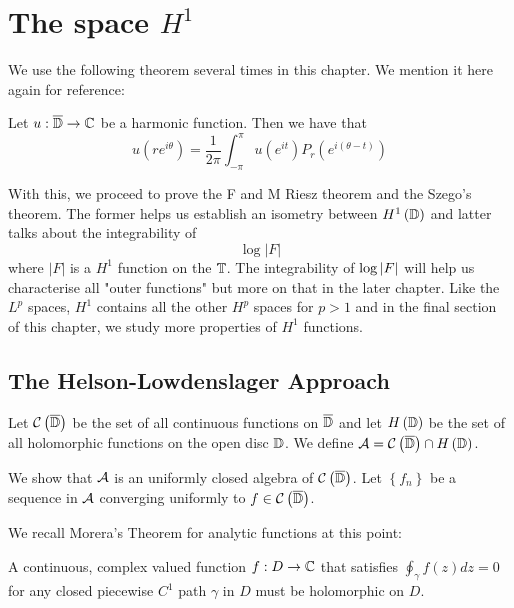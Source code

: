 \chapter{The space \texorpdfstring{$H^1$}{}}
We use the following theorem several times in this chapter. We mention it here again for reference:
\begin{theorem}
    Let $u : \overline{\mathbb D} \to \mathbb C$ be a harmonic function. Then we have that
    \begin{equation*}
	u\left( re^{i\theta} \right) = \frac{1}{2\pi} \int_{-\pi}^{\pi} u\left( e^{it} \right) P_{r} \left( e^{i\left( \theta-t \right)} \right)
    \end{equation*}
    \label{thm:Poisson-Integral-Formula}
\end{theorem}

With this, we proceed to prove the F and M Riesz theorem and the Szego's theorem. The former helps us establish an isometry between $H^{1}\left( \mathbb D \right)$ and latter talks about the integrability of
\begin{equation*}
    \log |F|
\end{equation*}
where $|F|$ is a $H^{1}$ function on the $\mathbb T$. The integrability of $\log \left\lvert F \right\rvert$ will help us characterise all "outer functions" but more on that in the later chapter. Like the $L^{p}$ spaces, $H^{1}$ contains all the other $H^{p}$ spaces for $p>1$ and in the final section of this chapter, we study more properties of $H^{1}$ functions.

\section{The Helson-Lowdenslager Approach}
Let ${\cal C} \left( \overline {\mathbb D} \right)$ be the set of all continuous functions on $\overline{\mathbb D}$ and let $H\left( \mathbb D \right)$ be the set of all holomorphic functions on the open disc $\mathbb D$. We define ${\cal A} ={\cal C} \left( \overline{ \mathbb D } \right) \cap H \left( \mathbb D \right)$.

We show that ${\cal A}$ is an uniformly closed algebra of ${\cal C} \left( \overline{ \mathbb D } \right)$. Let $\left\{ f_{n} \right\}$ be a sequence in ${\cal A}$ converging uniformly to $f\in {\cal C} \left( \overline {\mathbb D} \right)$.

We recall Morera's Theorem for analytic functions at this point:
\begin{theorem}[Morera]
    A continuous, complex valued function $f : D \to \mathbb C$ that satisfies $\oint _{\gamma} f \left( z \right) dz = 0$ for any closed piecewise $C^{1}$ path $\gamma$ in $D$ must be holomorphic on $D$.
    \label{thm:morera-analytic}
\end{theorem}

